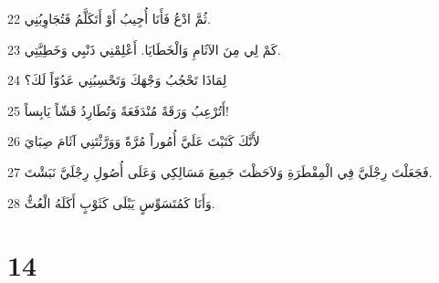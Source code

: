 \par 22 ثُمَّ ادْعُ فَأَنَا أُجِيبُ أَوْ أَتَكَلَّمُ فَتُجَاوِبُنِي.
\par 23 كَمْ لِي مِنَ الآثَامِ وَالْخَطَايَا. أَعْلِمْنِي ذَنْبِي وَخَطِيَّتِي.
\par 24 لِمَاذَا تَحْجُبُ وَجْهَكَ وَتَحْسِبُنِي عَدُوّاً لَكَ؟
\par 25 أَتُرْعِبُ وَرَقَةً مُنْدَفَعَةً وَتُطَارِدُ قَشّاً يَابِساً!
\par 26 لأَنَّكَ كَتَبْتَ عَلَيَّ أُمُوراً مُرَّةً وَوَرَّثْتَنِي آثَامَ صِبَايَ
\par 27 فَجَعَلْتَ رِجْلَيَّ فِي الْمِقْطَرَةِ وَلاَحَظْتَ جَمِيعَ مَسَالِكِي وَعَلَى أُصُولِ رِجْلَيَّ نَبَشْتَ.
\par 28 وَأَنَا كَمُتَسَوِّسٍ يَبْلَى كَثَوْبٍ أَكَلَهُ الْعُثُّ.

\chapter{14}

